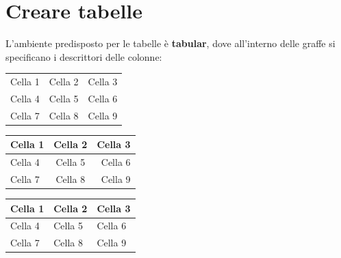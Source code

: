 \documentclass[a4paper,12pt,oneside]{book}
\theoremstyle{plain}
\begin{document}
	\chapter{Creare tabelle}
	L'ambiente predisposto per le tabelle è \textbf{tabular}, dove all'interno delle graffe si specificano i descrittori delle colonne:
	\begin{center}
		\begin{tabular}{l c r}
			Cella 1 & Cella 2 & Cella 3\\
			Cella 4 & Cella 5 & Cella 6\\
			Cella 7 & Cella 8 & Cella 9
		\end{tabular}
	\end{center}
	\begin{center}
		\begin{tabular}{l | c r}
			\hline
			Cella 1 & Cella 2 & Cella 3\\ [0.5ex]
			\hline
			Cella 4 & Cella 5 & Cella 6\\
			\hline
			Cella 7 & Cella 8 & Cella 9\\ [1ex]
			\hline
		\end{tabular}
	\end{center}
	\begin{center}
		\begin{tabular}{ | m{8em} | m{2cm} | m{1cm} | } 
			\hline
			Cella 1 & Cella 2 & Cella 3\\
			\hline
			Cella 4 & Cella 5 & Cella 6\\
			\hline
			Cella 7 & Cella 8 & Cella 9\\
			\hline
		\end{tabular}
	\end{center}
\end{document}
